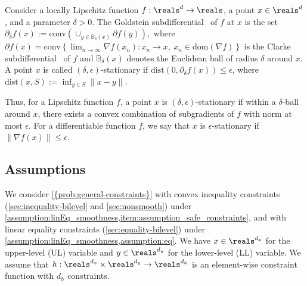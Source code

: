 \begin{definition}\label{def:GoldsteinDeltaEpsStationary}
 Consider a locally Lipschitz function $f:\reals^d\to\reals$, a point $x\in\reals^d$, and a parameter $\delta>0$. The {Goldstein subdifferential}~\cite{goldstein1977optimization} of $f$ at $x$ is the set
 $\partial_{\delta} f(x):=\mathrm{conv} (\cup_{y\in \mathbb{B}_{\delta}(x)}\partial f(y)),$ where  $\partial f(x)=\mathrm{conv}\left\{\lim_{n\to \infty} \nabla f(x_n): x_n\to x, ~x_n\in \mathrm{dom}(\nabla f)\right\}$ is the Clarke subdifferential~\cite{clarke1981generalized} of $f$ and $\mathbb B_\delta(x)$ denotes the Euclidean ball of radius $\delta$ around $x$.
 A point $x$ is called $(\delta, \epsilon)$-stationary if $\mathrm{dist}(0,\partial_{\delta}f(x))\leq \epsilon$, where $\mathrm{dist}(x,S):=\inf_{y\in S}\|x-y\|$.

\end{definition}
%
Thus, for a Lipschitz function $f$, a point $x$ is $(\delta, \epsilon)$-stationary if within a $\delta$-ball around $x$, there exists a convex combination of  subgradients of $f$ with norm at most $\epsilon$. 
For a differentiable function $f$, we say that $x$ is $\epsilon$-stationary if $\|\nabla f(x)\|\leq \epsilon$. 

\subsection{Assumptions}\label{sec:differentiable-optimization}
We consider \cref{{prob:general-constraints}} with convex inequality constraints (\cref{sec:inequality-bilevel} and \cref{sec:nonsmooth}) under \cref{assumption:linEq_smoothness,item:assumption_safe_constraints}, and with linear equality constraints (\cref{sec:equality-bilevel}) under \cref{assumption:linEq_smoothness,assumption:eq}. 
We have $x\in \reals^{d_x}$ for the upper-level (UL) variable and $y\in \reals^{d_y}$ for the lower-level (LL) variable. We assume that $h:\reals^{d_x} \times \reals^{d_y}\to \reals^{d_h}$ is an element-wise constraint function with $d_h$ constraints. %

